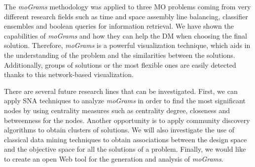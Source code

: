 \documentclass[journal]{IEEEtran}
\begin{document}
The \emph{moGrams} methodology was applied to three MO problems coming from very different research fields such as time and space assembly line balancing, classifier ensembles and boolean queries for information retrieval. We have shown the capabilities of \emph{moGrams} and how they can help the DM when choosing the final solution. Therefore, \emph{moGrams} is a powerful visualization technique, which aids in the understanding of the problem and the similarities between the solutions. Additionally, groups of solutions or the most flexible ones are easily detected thanks to this network-based visualization.

There are several future research lines that can be investigated. First, we can apply SNA techniques to analyze \emph{moGrams} in order to find the most significant nodes by using centrality measures such as centrality degree, closeness and betweenness for the nodes. Another opportunity is to apply community discovery algorithms to obtain clusters of solutions. We will also investigate the use of classical data mining techniques to obtain associations between the design space and the objective space for all the solutions of a problem. Finally, we would like to create an open Web tool for the generation and analysis of \emph{moGrams}.








\end{document}
